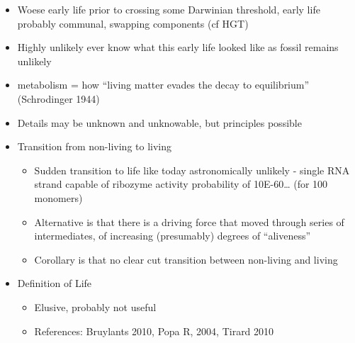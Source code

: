 		\begin{itemize}
			\item
			
			Woese early life prior to crossing some Darwinian threshold, early
			life probably communal, swapping components (cf HGT)
			
			\item
			
			Highly unlikely ever know what this early life looked like as fossil
			remains unlikely
			
			\item
			
			metabolism = how ``living matter evades the decay to equilibrium''
			(Schrodinger 1944)
			
			\item
			
			Details may be unknown and unknowable, but principles possible
			
			\item
			
			Transition from non-living to living
			
			
			\begin{itemize}
				\item
				
				Sudden transition to life like today astronomically unlikely -
				single RNA strand capable of ribozyme activity probability of
				10E-60\ldots{} (for 100 monomers)
				
				\item
				
				Alternative is that there is a driving force that moved through
				series of intermediates, of increasing (presumably) degrees of
				``aliveness''
				
				\item
				
				Corollary is that no clear cut transition between non-living and
				living
				
			\end{itemize}
			\item
			
			Definition of Life
			
			
			\begin{itemize}
				\item
				
				Elusive, probably not useful
				
				\item
				
				References: Bruylants 2010, Popa R, 2004, Tirard 2010
				

\end{itemize}
\end{itemize}
